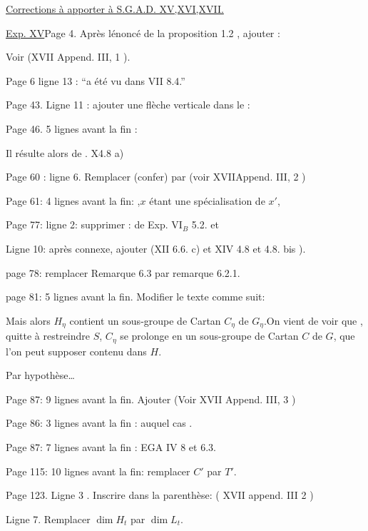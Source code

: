 \uline{Corrections à apporter à S.G.A.D. XV,XVI,XVII.}

\uline{Exp. XV}\quad Page 4. Après lénoncé de la proposition 1.2 , ajouter :

Voir (XVII Append. III, 1 ).

Page 6 ligne 13 : ``a été vu dans  VII 8.4.''

Page 43. Ligne 11 : ajouter une flèche verticale dans le :

Page 46. 5 lignes avant la fin :

Il résulte alors de . X\inserted{,}4.8\inserted{(} a)

Page 60 : ligne 6. Remplacer (confer\hspace{2em}) par (voir XVII\inserted{,}Append. III, 2 )

Page 61: 4 lignes avant la fin: ,$x$ étant une spécialisation de $x'$, 

Page 77: ligne 2: supprimer : de Exp. VI$_B$ 5.2. et

Ligne 10: après connexe, ajouter (XII 6.6. c) et XIV 4.8 et 4.8. bis ).

page 78: remplacer Remarque 6.3 par remarque 6.2.1.

page 81: 5 lignes avant la fin. Modifier le texte comme suit:

Mais alors $H_\eta$ contient un sous-groupe de Cartan $C_\eta$ de $G_\eta$.On vient de voir que , quitte à restreindre $S$, $C_\eta$ se prolonge en un sous-groupe de Cartan $C$ de $G$, que l'on peut supposer contenu dans $H$.

Par hypothèse\ldots

Page 87: 9 lignes avant la fin. Ajouter (Voir XVII\inserted{,} Append. III, 3 )

Page 86: 3 lignes avant la fin : auquel cas .

Page 87: 7 lignes avant la fin : EGA IV 8 et 6.3.

Page 115: 10 lignes avant la fin: remplacer $C'$ par $T'$.

Page 123. Ligne 3 . Inscrire dans la parenthèse: ( XVII append. III\inserted{,} 2 )

Ligne 7. Remplacer $\dim H_t$ par $\dim L_t$.

